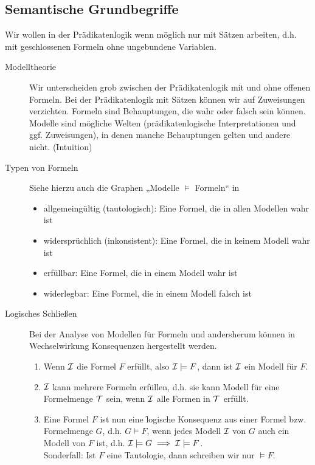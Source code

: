 \newpage
\subsection{Semantische Grundbegriffe}
    Wir wollen in der Prädikatenlogik wenn möglich nur mit Sätzen arbeiten, d.h. mit geschlossenen Formeln ohne ungebundene Variablen. 
    \begin{description}
        \item[Modelltheorie] Wir unterscheiden grob zwischen der Prädikatenlogik mit und ohne offenen Formeln. Bei der Prädikatenlogik mit Sätzen können wir auf Zuweisungen verzichten. Formeln sind Behauptungen, die wahr oder falsch sein können. Modelle sind mögliche Welten (prädikatenlogische Interpretationen und ggf. Zuweisungen), in denen manche Behauptungen gelten und andere nicht. (\f{Intuition})

        \item[Typen von Formeln]
            Siehe hierzu auch die Graphen „Modelle $\models$ Formeln“ in 
            \begin{itemize}
                \item allgemeingültig (tautologisch): Eine Formel, die in allen Modellen wahr ist
                \item widersprüchlich (inkonsistent): Eine Formel, die in keinem Modell wahr ist
                \item erfüllbar: Eine Formel, die in einem Modell wahr ist
                \item widerlegbar: Eine Formel, die in einem Modell falsch ist
            \end{itemize}

        \item[Logisches Schließen] Bei der Analyse von Modellen für Formeln und andersherum können in Wechselwirkung Konsequenzen hergestellt werden.
            \begin{enumerate}
                \item Wenn $\mathcal{I}$ die Formel $F$ erfüllt, also $\mathcal{I} \models F$, dann ist $\mathcal{I}$ ein Modell für $F$.
                \item $\mathcal{I}$ kann mehrere Formeln erfüllen, d.h. sie kann Modell für eine Formelmenge $\mathcal{T}$ sein, wenn $\mathcal{I}$ alle Formen in $\mathcal{T}$ erfüllt.

                \item Eine Formel $F$ ist nun eine \f{logische Konsequenz} aus einer Formel bzw. Formelmenge $G$, d.h. $G \models F$, wenn jedes Modell $\mathcal{I}$ von $G$ auch ein Modell von $F$ ist, d.h. $\mathcal{I} \models G \implies \mathcal{I} \models F$. \\
                Sonderfall: Ist $F$ eine Tautologie, dann schreiben wir nur $\models F$. \\


\end{enumerate}
\end{description}
